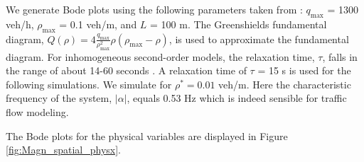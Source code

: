 \documentclass[a4paper, 10pt, conference]{ieeeconf}      %
\begin{document}
We generate Bode plots using the following parameters taken from \cite{Hofleitner}: $q_{\text{max}}$ = 1300 veh/h, $\rho_{\text{max}}$ = 0.1 veh/m, and $L$ = 100 m. The Greenshields fundamental diagram, {\footnotesize $Q( \rho) = 4 \frac{q_{\text{max}}}{\rho_{\text{max}}^2}\rho (\rho_{\text{max}} - \rho)$}, is used to approximate the fundamental diagram. For inhomogeneous second-order models, the relaxation time, $\tau$, falls in the range of about 14-60 seconds \cite{Fan}. A relaxation time of $\tau$ = 15 s is used for the following simulations. We simulate for $\rho^* = 0.01$ veh/m. Here the characteristic frequency of the system, $\left|\alpha\right|$, equals 0.53 Hz which is indeed sensible for traffic flow modeling.

The Bode plots for the physical variables are displayed in Figure \ref{fig:Magn_spatial_physx}.
\end{document}

